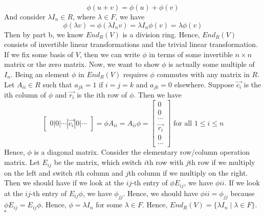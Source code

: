 \documentclass[12pt]{amsart}
\begin{document}
\[\phi(u+v)=\phi(u)+\phi(v)\]
And consider $\lambda I_n\in R$, where $\lambda\in F$, we have 
\[\phi(\lambda v)=\phi(\lambda I_nv)=\lambda I_n\phi(v)=\lambda\phi(v)\]
Then by part b, we know $End_R(V)$ is a division ring. Hence, $End_R(V)$ consists of invertible linear transformations and the trivial linear transformation. If we fix some basis of $V$, then we can write $\phi$ in terms of some invertible $n\times n$ matrix or the zero matrix. Now, we want to show $\phi$ is actually some multiple of $I_n$. Being an element $\phi$ in $End_R(V)$ requires $\phi$ commutes with any matrix in $R$. Let $A_{ii}\in R$ such that $a_{jk}=1$ if $i=j=k$ and $a_{jk}=0$ elsewhere. Suppose $\vec{c_i}$ is the ith column of $\phi$ and $\vec{r_i}$ is the ith row of $\phi$. Then we have 
\[\begin{bmatrix}
    0 |0 |\cdots |\vec{c_i}|0|\cdots
\end{bmatrix}=\phi A_{ii}=A_{ii}\phi=\begin{bmatrix}
    0\\
    0\\
    \cdots\\
    \vec{r_i}\\
    0\\
    \cdots
\end{bmatrix} \text{ for all } 1\leq i\leq n\]
Hence, $\phi$ is a diagonal matrix. Consider the elementary row/column operation matrix. Let $E_{ij}$ be the matrix, which switch $i$th row with $j$th row if we multiply on the left and switch $i$th column and $j$th column if we multiply on the right. Then we should have if we look at the $ij$-th entry of $\phi E_{ij}$, we have $\phi{ii}$. If we look at the $ij$-th entry of $E_{ij}\phi$, we have $\phi_{jj}$. Hence, we should have $\phi{ii}=\phi_{jj}$ because $\phi E_{ij}=E_{ij}\phi$. Hence, $\phi=\lambda I_n$ for some $\lambda\in F$. Hence, $End_R(V)=\{\lambda I_n\mid \lambda\in F\}$.
\\\phantom{qed}\hfill$\square$\\
\end{document}
